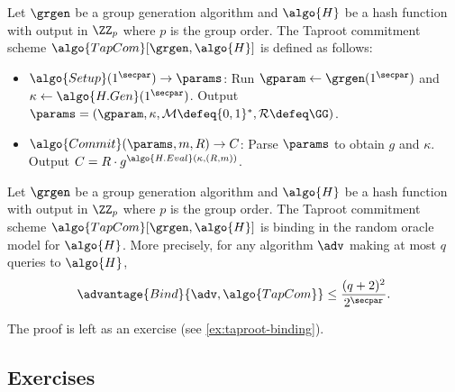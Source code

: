 \begin{definition}
  Let $\grgen$ be a group generation algorithm and $\algo{H}$ be a hash function with output in $\ZZ_p$ where $p$ is the group order. 
  The Taproot commitment scheme $\algo{TapCom}[\grgen, \algo{H}]$ is defined as follows:
  \begin{itemize}
    \item $\algo{Setup}(1^\secpar) \rightarrow \params$: Run $\gparam \gets \grgen(1^\secpar)$ and $\kappa \gets \algo{H.Gen}(1^\secpar)$. Output $\params = (\gparam, \kappa, \mathcal{M} \defeq \{0,1\}^*, \mathcal{R} \defeq \GG)$.
    \item $\algo{Commit}(\params, m, R) \rightarrow C$: Parse $\params$ to obtain $g$ and $\kappa$. Output $C = R \cdot g^{\algo{H.Eval}(\kappa, (R, m))}$.
  \end{itemize}
\end{definition}

\begin{lemma}\label{lem:taproot-binding}
  Let $\grgen$ be a group generation algorithm and $\algo{H}$ be a hash function with output in $\ZZ_p$ where $p$ is the group order.
  The Taproot commitment scheme $\algo{TapCom}[\grgen, \algo{H}]$ is binding in the random oracle model for $\algo{H}$.
  More precisely, for any algorithm $\adv$ making at most $q$ queries to $\algo{H}$,
  \[
  \advantage{Bind}{\adv, \algo{TapCom}} \leq \frac{(q+2)^2}{2^\secpar}.
  \]
\end{lemma}

The proof is left as an exercise (see \autoref{ex:taproot-binding}).

\subsection{Exercises}

